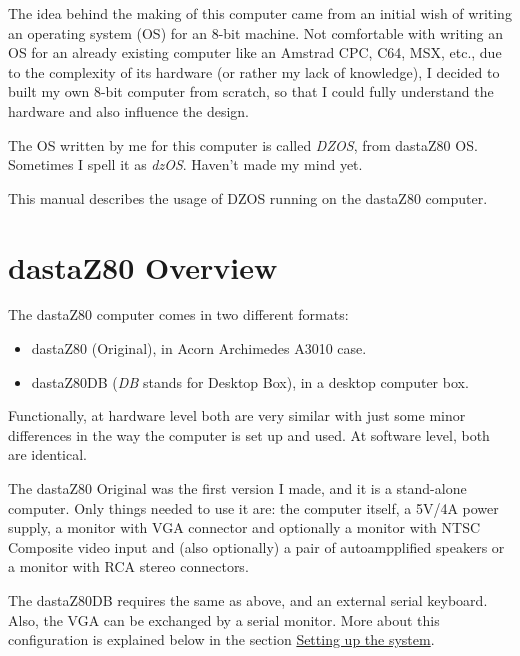 \documentclass[a4paper,11pt]{article}
\begin{document}
    The idea behind the making of this computer came from an initial wish of
    writing an operating system (OS) for an 8-bit machine. Not comfortable with
    writing an OS for an already existing computer like an Amstrad CPC, C64,
    MSX, etc., due to the complexity of its hardware (or rather my lack of
    knowledge), I decided to built my own 8-bit computer from scratch, so that
    I could fully understand the hardware and also influence the design.

    The OS written by me for this computer is called \textit{DZOS}, from 
    dastaZ80 OS. Sometimes I spell it as \textit{dzOS}. Haven’t made my mind 
    yet.

    This manual describes the usage of DZOS running on the dastaZ80 computer.
    
    \pagebreak
    \section{dastaZ80 Overview}

    The dastaZ80 computer comes in two different formats:

    \begin{itemize}
        \item dastaZ80 (Original), in Acorn Archimedes A3010 case.
        \item dastaZ80DB (\textit{DB} stands for Desktop Box), in a desktop
            computer box.
    \end{itemize}

    Functionally, at hardware level both are very similar with just some minor
    differences in the way the computer is set up and used. At software level,
    both are identical.

    The dastaZ80 Original was the first version I made, and it is a stand-alone
    computer. Only things needed to use it are: the computer itself, a 5V/4A
    power supply, a monitor with VGA connector and optionally a monitor with 
    NTSC Composite video input and (also optionally) a pair of autoampplified
    speakers or a monitor with RCA stereo connectors.

    The dastaZ80DB requires the same as above, and an external serial keyboard.
    Also, the VGA can be exchanged by a serial monitor. More about this 
    configuration is explained below in the section \hyperref[sec:setting_system]
    {Setting up the system}.
\end{document}
